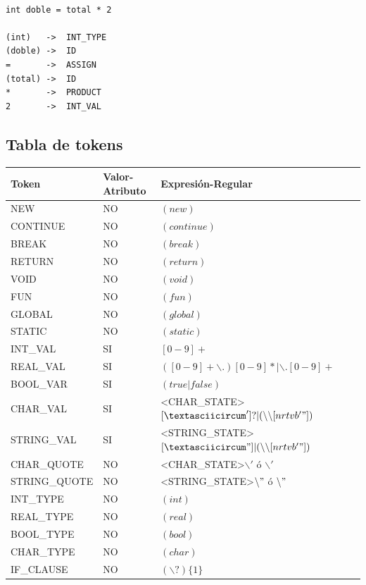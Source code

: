 \documentclass[11pt, english]{article}
\begin{document}
\begin{lstlisting}[caption=Ejemplo de conversión de un conjunto de caracteres de un programa WiC en tokens]

int doble = total * 2

(int) 	-> 	INT_TYPE
(doble) -> 	ID
= 		-> 	ASSIGN
(total) -> 	ID
* 		-> 	PRODUCT
2		->	INT_VAL

\end{lstlisting}

\subsection{Tabla de tokens}\label{Tabla de tokens}

\begin{table}[H]
	\begin{tabular}{l|l|l|l}
		\toprule
		\textbf{Token} & \textbf{Valor-Atributo} & \textbf{Expresión-Regular}\\
		\midrule
		NEW & NO & $(new)$ \\
		CONTINUE & NO & $(continue)$ \\
		BREAK & NO & $(break)$ \\
		RETURN & NO & $(return)$ \\
		VOID & NO & $(void)$ \\
		FUN & NO & $(fun)$ \\
		GLOBAL & NO & $(global)$ \\
		STATIC	& NO & $(static)$ \\
		INT\_VAL & SI & $[0-9]+$ \\
		REAL\_VAL & SI & $([0-9]+\backslash.)[0-9]*|\backslash.[0-9]+$ \\
		BOOL\_VAR & SI & $(true|false)$ \\
		CHAR\_VAL & SI & <CHAR\_STATE>$[\textasciicircum']?|(\backslash \backslash[nrtvb'"])$ \\
		STRING\_VAL & SI & <STRING\_STATE>$[\textasciicircum"]|(\backslash\backslash[nrtvb'"])$ \\
		CHAR\_QUOTE & NO & <CHAR\_STATE>$\backslash '$ ó $\backslash '$ \\
		STRING\_QUOTE & NO & <STRING\_STATE>$\backslash "$ ó $\backslash "$ \\
		INT\_TYPE & NO & $(int)$ \\
		REAL\_TYPE  & NO & $(real)$ \\
		BOOL\_TYPE & NO & $(bool)$ \\
		CHAR\_TYPE & NO & $(char)$ \\
		IF\_CLAUSE & NO & $(\backslash?)\{1\}$ \\

\end{tabular}
\end{table}
\end{document}
